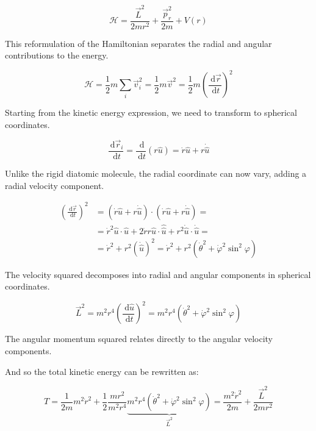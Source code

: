 \documentclass[italian]{HKNdocument}
\begin{document}
\begin{equation}
\mathcal{H}=\frac{\vec{L}^{2}}{2 m r^{2}}+\frac{\vec{p}_{r}^{2}}{2 m}+V(r) \label{eq:9.3}
\end{equation}

This reformulation of the Hamiltonian separates the radial and angular contributions to the energy.

\begin{equation}
\mathcal{H}=\frac{1}{2} m \sum_{i} \vec{v}_{i}^{2}=\frac{1}{2} m \vec{v}^{2}=\frac{1}{2} m\left(\frac{\mathrm{~d} \vec{r}}{\mathrm{~d} t}\right)^{2} \label{eq:9.4}
\end{equation}

Starting from the kinetic energy expression, we need to transform to spherical coordinates.

\begin{equation}
\frac{\mathrm{~d} \vec{r}_{i}}{\mathrm{~d} t}=\frac{\mathrm{~d}}{\mathrm{~d} t}(r \hat{u})=\dot{r} \hat{u}+r \dot{\hat{u}} \label{eq:9.5}
\end{equation}

Unlike the rigid diatomic molecule, the radial coordinate can now vary, adding a radial velocity component.

\begin{align}
\left(\frac{\mathrm{~d} \vec{r}}{\mathrm{~d} t}\right)^{2} & =(\dot{r} \hat{u}+r \dot{\hat{u}}) \cdot(\dot{r} \hat{u}+r \dot{\hat{u}})= \\
& =\dot{r}^{2} \hat{u} \cdot \hat{u}+2 \dot{r} r \hat{u} \cdot \hat{\hat{u}}+r^{2} \dot{\hat{u}} \cdot \dot{\hat{u}}=  \label{eq:9.6}\\
& =\dot{r}^{2}+r^{2}(\dot{\hat{u}})^{2}=\dot{r}^{2}+r^{2}\left(\dot{\theta}^{2}+\dot{\varphi}^{2} \sin ^{2} \varphi\right)
\end{align}

The velocity squared decomposes into radial and angular components in spherical coordinates.

\begin{equation}
\vec{L}^{2}=m^{2} r^{4}\left(\frac{\mathrm{~d} \hat{u}}{\mathrm{~d} t}\right)^{2}=m^{2} r^{4}\left(\dot{\theta}^{2}+\dot{\varphi}^{2} \sin ^{2} \varphi\right) \label{eq:9.7}
\end{equation}

The angular momentum squared relates directly to the angular velocity components.

And so the total kinetic energy can be rewritten as:

\begin{equation}
T=\frac{1}{2 m} m^{2} \dot{r}^{2}+\frac{1}{2} \frac{m r^{2}}{m^{2} r^{4}} \underbrace{m^{2} r^{4}\left(\dot{\theta}^{2}+\dot{\varphi}^{2} \sin ^{2} \varphi\right)}_{\vec{L}^{2}}=\frac{m^{2} \dot{r}^{2}}{2 m}+\frac{\vec{L}^{2}}{2 m r^{2}} \label{eq:9.8}
\end{equation}
\end{document}
